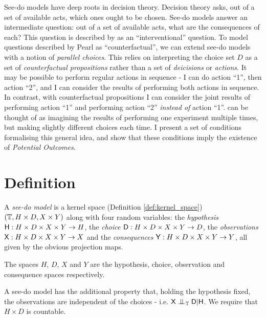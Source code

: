 See-do models have deep roots in decision theory. Decision theory asks, out of a set of available acts, which ones ought to be chosen. See-do models answer an intermediate question: out of a set of available acts, what are the consequences of each? This question is described by \citet{pearl_causality:_2009} as an ``interventional'' question. To model questions described by Pearl as ``counterfactual'', we can extend see-do models with a notion of \emph{parallel choices}.  This relies on interpreting the choice set $D$ as a set of \emph{counterfactual propositions} rather than a set of \emph{deicisions} or \emph{actions}. It may be possible to perform regular actions in sequence - I can do action ``1'', then action ``2'', and I can consider the results of performing both actions in sequence. In contrast, with counterfactual propositions I can consider the joint results of performing action ``1'' and performing action ``2'' \emph{instead of} action ``1''. can be thought of as imagining the results of performing one experiment multiple times, but making slightly different choices each time. I present a set of conditions formalising this general idea, and show that these conditions imply the existence of \emph{Potential Outcomes}. 

\section{Definition}


\begin{definition}\label{def:seedo}
A \emph{see-do model} is a kernel space (Definition \ref{def:kernel_space}) $(\mathbb{T},H\times D,X\times Y)$ along with four random variables: the \emph{hypothesis} $\mathsf{H}:H\times D\times X\times Y\to H$, the \emph{choice} $\mathsf{D}:H\times D\times X\times Y\to D$, the \emph{observations} $\mathsf{X}:H\times D\times X\times Y\to X$ and the \emph{consequences} $\mathsf{Y}:H\times D\times X\times Y\to Y$, all given by the obvious projection maps. 

The spaces $H$, $D$, $X$ and $Y$ are the hypothesis, choice, observation and consequence spaces respectively.

A see-do model has the additional property that, holding the hypothesis fixed, the observations are independent of the choices - i.e. $\RV{X}\CI_{\kernel{T}} \RV{D}|\RV{H}$. We require that $H\times D$ is countable.
\end{definition}


